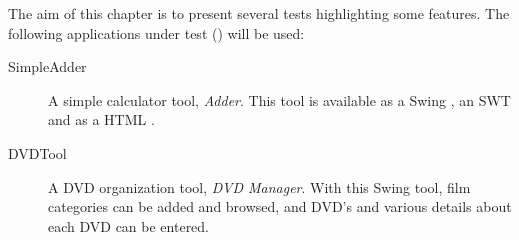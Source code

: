 
The aim of this chapter is to present several tests highlighting some features. The following applications under test (\gdauts) will be used:


\begin{description}
\item[SimpleAdder]{ A simple calculator tool, \emph{Adder}. This tool is available as a Swing \gdaut{}, an SWT \gdaut{} and as a HTML \gdaut{}. }
\item [DVDTool]{A DVD organization tool, \emph{DVD Manager}. With this Swing tool, film categories can be added and browsed, and DVD's and various details about each DVD can be entered.}  
\end{description}


